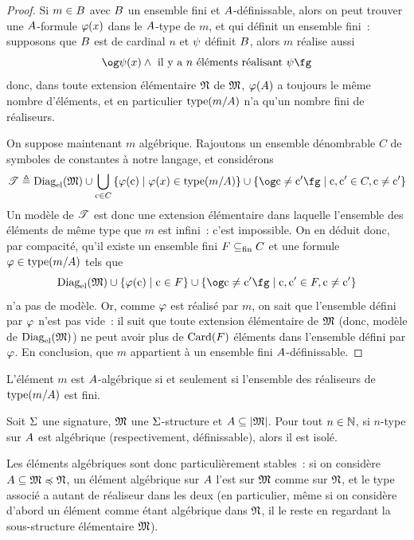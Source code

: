 \begin{proof}
  Si $m\in B$ avec $B$ un ensemble fini et $A$-définissable,
  alors on peut trouver une $A$-formule $\varphi(x)$ dans le $A$-type
  de $m$, et qui définit un ensemble fini~: supposons que $B$ est de
  cardinal $n$ et $\psi$ définit $B$, alors $m$ réalise aussi
  \[\ogM\varFP(x) \land \text{ il y a } n\text{ éléments réalisant }\varFP\fgM\]
  donc, dans toute extension élémentaire $\mathfrak{N}$ de $\mathfrak{M}$, $\varphi(A)$
  a toujours le même nombre d'éléments, et en particulier $\operatorname{type}(m/A)$ n'a
  qu'un nombre fini de réaliseurs.

  On suppose maintenant $m$ algébrique. Rajoutons un ensemble dénombrable
  $C$ de symboles de constantes à notre langage, et considérons
  \[\varT \defeq \DiagEl(\varMM)\cup
  \bigcup_{\Cc \in C}\compr{\varFF(\Cc)}{\varFF(x)\in\type(m/\varPt)}\cup
  \compr{\ogM \Cc \neq \Cc'\fgM}{\Cc,\Cc'\in C, \Cc\neq \Cc'}\]
  Un modèle de $\mathscr T$ est donc une extension élémentaire dans laquelle
  l'ensemble des éléments de même type que $m$ est infini~: c'est impossible.
  On en déduit donc, par compacité, qu'il existe un ensemble fini $F\subseteq_{\mathrm{fin}} C$
  et une formule $\varphi\in\operatorname{type}(m/A)$ tels que
  \[\DiagEl(\varMM)\cup\compr{\varFF(\Cc)}{\Cc\in F}\cup
  \compr{\ogM\Cc \neq \Cc'\fgM}{\Cc,\Cc'\in F,\Cc\neq \Cc'}\]
  n'a pas de modèle. Or, comme $\varphi$ est réalisé par $m$, on sait que
  l'ensemble défini par $\varphi$ n'est pas vide~: il suit que toute extension
  élémentaire de $\mathfrak{M}$ (donc, modèle de $\operatorname{Diag}_{\mathrm{el}}(\mathfrak{M})$) ne peut avoir plus
  de $\operatorname{Card}(F)$ éléments dans l'ensemble défini par $\varphi$. En conclusion, que
  $m$ appartient à un ensemble fini $A$-définissable.
\end{proof}

\begin{corollary}
  L'élément $m$ est $A$-algébrique si et seulement si l'ensemble des
  réaliseurs de $\operatorname{type}(m/A)$ est fini.
\end{corollary}

\begin{corollary}
  Soit $\Sigma$ une signature, $\mathfrak{M}$ une $\Sigma$-structure et
  $A\subseteq\left\vert \mathfrak{M}\right\vert$. Pour tout $n \in \mathbb N$, si $n$-type sur $A$ est
  algébrique (respectivement, définissable), alors il est isolé.
\end{corollary}

Les éléments algébriques sont donc particulièrement stables~: si on considère
$A\subseteq\mathfrak{M}\preccurlyeq\mathfrak{N}$, un élément algébrique sur $A$
l'est sur $\mathfrak{M}$ comme sur $\mathfrak{N}$, et le type associé a autant de réaliseur
dans les deux (en particulier, même si on considère d'abord un élément comme
étant algébrique dans $\mathfrak{N}$, il le reste en regardant la sous-structure
élémentaire $\mathfrak{M}$).

